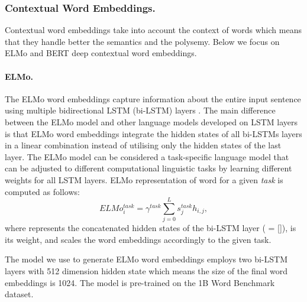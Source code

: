 \documentclass[hidelinks]{llncs}
\begin{document}
\subsubsection{Contextual Word Embeddings. }Contextual word embeddings take into account the context of words which means that they handle better the semantics and the polysemy. Below we focus on ELMo and BERT deep contextual word embeddings.



\paragraph{ELMo. }The ELMo word embeddings capture information about the entire input sentence using multiple bidirectional LSTM (bi-LSTM) layers \cite{peters2018deep}. The main difference between the ELMo model and other language models developed on LSTM layers is that ELMo word embeddings integrate the hidden states of  all  bi-LSTMs layers in a linear combination instead of utilising only the hidden states of the last layer. The ELMo model can be considered a task-specific language model that can be adjusted to different computational linguistic tasks by learning  different weights for all LSTM layers. ELMo representation of word  for a given \textit{task}  is computed as follows:
\begin {equation}
\label{equation9}
ELMo_i^{task} = \gamma^{task}\sum_{j = 0}^Ls_j^{task}h_{i, j},
\end {equation}
where  represents the concatenated hidden states of the  bi-LSTM layer ( = []),  is its weight, and  scales the word embeddings accordingly to the given task.

The model we use to generate ELMo word embeddings employs two bi-LSTM layers with 512 dimension hidden state which means the size of the final word embeddings is 1024. The model is pre-trained on the 1B Word Benchmark dataset.
\end{document}
